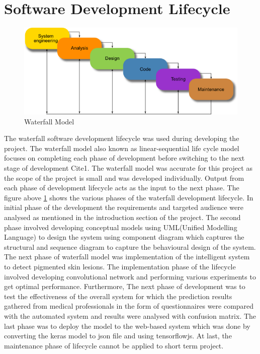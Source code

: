 \section{Software Development Lifecycle}

\begin{figure}[!htp]
    \centering
    \includegraphics[width=.8\textwidth]{Images/waterfall}
    \caption{Waterfall Model}
    \label{fig:waterfall}
\end{figure}


The waterfall software development lifecycle was used during developing the project. The waterfall
model also known as linear-sequential life cycle model focuses on completing each phase of
development before switching to the next stage of development Cite{1}. The waterfall model was
accurate for this project as the scope of the project is small and was developed individually. Output
from each phase of development lifecycle acts as the input to the next phase. The figure above
\ref{fig:waterfall} shows the various phases of the waterfall development lifecycle. In initial phase of the
development the requirements and targeted audience were analysed as mentioned in the
introduction section of the project. The second phase involved developing conceptual models using
UML(Unified Modelling Language) to design the system using component diagram which captures
the structural and sequence diagram to capture the behavioural design of the system. The next
phase of waterfall model was implementation of the intelligent system to detect pigmented skin
lesions. The implementation phase of the lifecycle involved developing convolutional network and
performing various experiments to get optimal performance. Furthermore, The next phase of
development was to test the effectiveness of the overall system for which the prediction results
gathered from medical professionals in the form of questionnaires were compared with the
automated system and results were analysed with confusion matrix. The last phase was to deploy
the model to the web-based system which was done by converting the keras model to json file and
using tensorflowjs. At last, the maintenance phase of lifecycle cannot be applied to short term
project.


